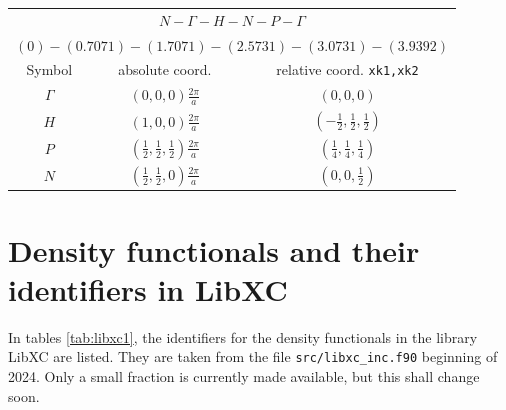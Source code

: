 \documentclass[final,12pt,makeidx,DIV=calc]{article}
\begin{document}
{{{{{{\begin{center}
\renewcommand\arraystretch{1.5}
\begin{tabular}{|c|c|c|}
\hline
\multicolumn{3}{|c|}{$N-\Gamma-H-N-P-\Gamma$}\\
\multicolumn{3}{|c|}{$(0)-(0.7071)-(1.7071)-(2.5731)-(3.0731)-(3.9392)$}\\
\hline
Symbol & absolute coord. & relative coord. \texttt{xk1,xk2}\\
\hline
$\Gamma$   & $(0,0,0) \frac{2\pi}{a}$ & $(0,0,0)$ \\ 
$H$        & $(1,0,0) \frac{2\pi}{a}$ & $(-\frac{1}{2},\frac{1}{2},\frac{1}{2})$ \\ 
$P$        & $(\frac{1}{2},\frac{1}{2},\frac{1}{2}) \frac{2\pi}{a}$ & $(\frac{1}{4},\frac{1}{4},\frac{1}{4})$ \\ 
$N$        & $(\frac{1}{2},\frac{1}{2},0) \frac{2\pi}{a}$ & $(0,0,\frac{1}{2})$ \\ 
\hline
\end{tabular}
\renewcommand\arraystretch{1.}
\end{center}
\clearpage


\newpage
\section{Density functionals and their identifiers in LibXC}
\label{sec:libxcids}
In tables \ref{tab:libxc1}, the identifiers for the density
functionals in the library LibXC are listed. They are taken from the
file \verb|src/libxc_inc.f90| beginning of 2024. Only a small fraction
is currently made available, but this shall change soon.


}}}}}}
\end{document}

